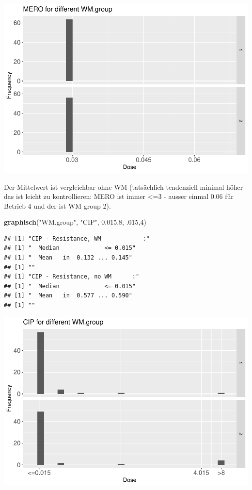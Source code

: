 \documentclass[
]{article}
\newenvironment{Shaded}{\begin{snugshade}}{\end{snugshade}}
\newcommand{\DecValTok}[1]{\textcolor[rgb]{0.00,0.00,0.81}{#1}}
\newcommand{\FloatTok}[1]{\textcolor[rgb]{0.00,0.00,0.81}{#1}}
\newcommand{\KeywordTok}[1]{\textcolor[rgb]{0.13,0.29,0.53}{\textbf{#1}}}
\newcommand{\NormalTok}[1]{#1}
\newcommand{\StringTok}[1]{\textcolor[rgb]{0.31,0.60,0.02}{#1}}
\begin{document}
\includegraphics{Verteilungen_files/figure-latex/unnamed-chunk-32-1.pdf}

Der Mittelwert ist vergleichbar ohne WM (tatsächlich tendenziell minimal
höher - das ist leicht zu kontrollieren: MERO ist immer \textless=3 -
ausser einmal 0.06 für Betrieb 4 und der ist WM group 2).

\begin{Shaded}
\begin{Highlighting}[]
  \KeywordTok{graphisch}\NormalTok{(}\StringTok{"WM.group"}\NormalTok{, }\StringTok{"CIP"}\NormalTok{, }\FloatTok{0.015}\NormalTok{,}\DecValTok{8}\NormalTok{, }\FloatTok{.015}\NormalTok{,}\DecValTok{4}\NormalTok{) }
\end{Highlighting}
\end{Shaded}

\begin{verbatim}
## [1] "CIP - Resistance, WM            :"
## [1] "  Median             <= 0.015"
## [1] "  Mean   in  0.132 ... 0.145"
## [1] ""
## [1] "CIP - Resistance, no WM      :"
## [1] "  Median             <= 0.015"
## [1] "  Mean   in  0.577 ... 0.590"
## [1] ""
\end{verbatim}

\includegraphics{Verteilungen_files/figure-latex/unnamed-chunk-33-1.pdf}
\end{document}
